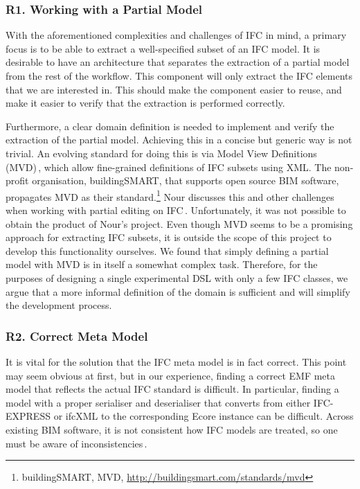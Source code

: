 \subsubsection{R1. Working with a Partial Model}
With the aforementioned complexities and challenges of IFC in mind, a primary focus is to be able to extract a well-specified subset of an IFC model. It is desirable to have an architecture that separates the extraction of a partial model from the rest of the workflow. This component will only extract the IFC elements that we are interested in. This should make the component easier to reuse, and make it easier to verify that the extraction is performed correctly.

Furthermore, a clear domain definition is needed to implement and verify the extraction of the partial model. Achieving this in a concise but generic way is not trivial. An evolving standard for doing this is via Model View Definitions (MVD)\,\cite{nour08}, which allow fine-grained definitions of IFC subsets using XML. The non-profit organisation, buildingSMART, that supports open source BIM software, propagates MVD as their standard.\footnote{buildingSMART, MVD, \url{http://buildingsmart.com/standards/mvd}} Nour discusses this and other challenges when working with partial editing on IFC\,\cite{nour08}. Unfortunately, it was not possible to obtain the product of Nour's project. Even though MVD seems to be a promising approach for extracting IFC subsets, it is outside the scope of this project to develop this functionality ourselves. We found that simply defining a partial model with MVD is in itself a somewhat complex task. Therefore, for the purposes of designing a single experimental DSL with only a few IFC classes, we argue that a more informal definition of the domain is sufficient and will simplify the development process.

\subsubsection{R2. Correct Meta Model}
It is vital for the solution that the IFC meta model is in fact correct. This point may seem obvious at first, but in our experience, finding a correct EMF meta model that reflects the actual IFC standard is difficult. In particular, finding a model with a proper serialiser and deserialiser that converts from either IFC-EXPRESS or ifcXML to the corresponding Ecore instance can be difficult. Across existing BIM software, it is not consistent how IFC models are treated, so one must be aware of inconsistencies\,\cite[p. 4]{quteprints37725}.

